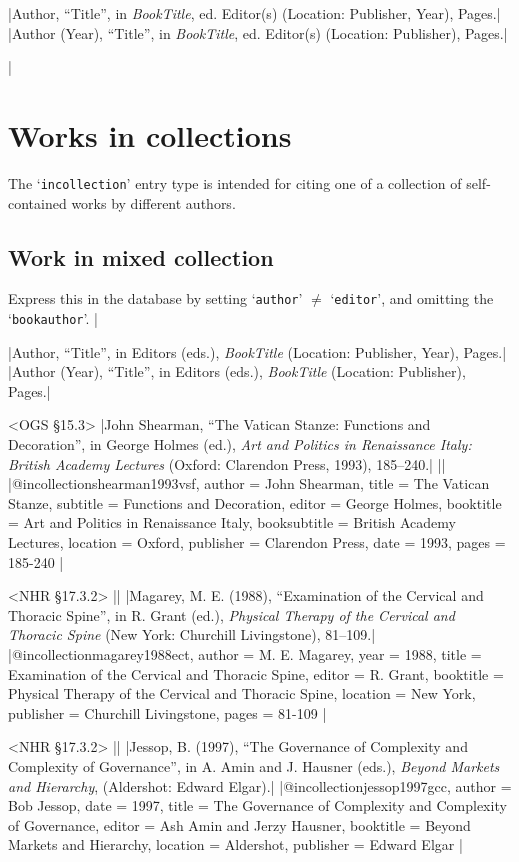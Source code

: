 \documentclass[extrafontsizes,11pt,a4paper,oneside]{memoir}
\newcommand*{\lit}[1]{\textsf{#1}}
\newcommand*{\code}[1]{`\texttt{#1}'}
\begin{document}
\specs
|Author, \enquote{Title}, \lit{in} \emph{BookTitle}, \lit{ed.} Editor(s) (Location: Publisher, Year), Pages.|%
|Author (Year), \enquote{Title}, \lit{in} \emph{BookTitle}, \lit{ed.} Editor(s) (Location: Publisher), Pages.|

\todoc|
\section{Works in collections}

The \code{incollection} entry type is intended for citing one of a collection of self-contained works by different authors.

\subsection{Work in mixed collection}

Express this in the database by setting \code{author} $\neq$ \code{editor}, and omitting the \code{bookauthor}.
|

\specs
|Author, \enquote{Title}, \lit{in} Editors (\lit{eds.}), \emph{BookTitle} (Location: Publisher, Year), Pages.|%
|Author (Year), \enquote{Title}, \lit{in} Editors (\lit{eds.}), \emph{BookTitle} (Location: Publisher), Pages.|

\bibexample<OGS \S15.3>
|John Shearman, \enquote{The Vatican Stanze: Functions and Decoration}, in George Holmes (ed.), \emph{Art and Politics in Renaissance Italy: British Academy Lectures} (Oxford: Clarendon Press, 1993), 185--240.|%
||%
|@incollection{shearman1993vsf,
  author = {John Shearman},
  title = {The Vatican Stanze},
  subtitle = {Functions and Decoration},
  editor = {George Holmes},
  booktitle = {Art and Politics in Renaissance Italy},
  booksubtitle = {British Academy Lectures},
  location = {Oxford},
  publisher = {Clarendon Press},
  date = {1993},
  pages = {185-240}
}|

\bibexample<NHR \S17.3.2>
||%
|Magarey, M. E. (1988), \enquote{Examination of the Cervical and Thoracic Spine}, in R. Grant (ed.), \emph{Physical Therapy of the Cervical and Thoracic Spine} (New York: Churchill Livingstone), 81–109.|%
|@incollection{magarey1988ect,
  author = {M. E. Magarey},
  year = {1988},
  title = {Examination of the Cervical and Thoracic Spine},
  editor = {R. Grant},
  booktitle = {Physical Therapy of the Cervical and Thoracic Spine},
  location = {New York},
  publisher = {Churchill Livingstone},
  pages = {81-109}
}|

\bibexample<NHR \S17.3.2>
||%
|Jessop, B. (1997), \enquote{The Governance of Complexity and Complexity of Governance}, in A. Amin and J. Hausner (eds.), \emph{Beyond Markets and Hierarchy}, (Aldershot: Edward Elgar).|%
|@incollection{jessop1997gcc,
  author = {Bob Jessop},
  date = {1997},
  title = {The Governance of Complexity and Complexity of Governance},
  editor = {Ash Amin and Jerzy Hausner},
  booktitle = {Beyond Markets and Hierarchy},
  location = {Aldershot},
  publisher = {Edward Elgar}
}|
\end{document}
